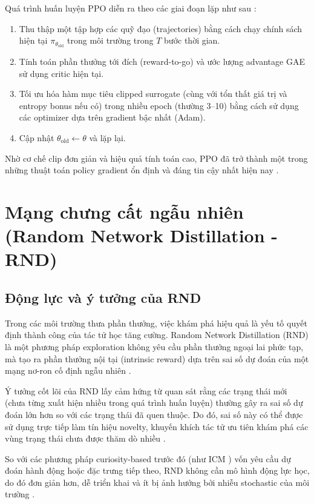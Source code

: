 \documentclass{uetgraduation}
\begin{document}
Quá trình huấn luyện PPO diễn ra theo các giai đoạn lặp như sau \cite{schulman2017}:
\begin{enumerate}
    \item Thu thập một tập hợp các quỹ đạo (trajectories) bằng cách chạy chính sách hiện tại $\pi_{\theta_{\text{old}}}$ trong môi trường trong $T$ bước thời gian.
    \item Tính toán phần thưởng tới đích (reward-to-go) và ước lượng advantage GAE sử dụng critic hiện tại.
    \item Tối ưu hóa hàm mục tiêu clipped surrogate (cùng với tổn thất giá trị và entropy bonus nếu có) trong nhiều epoch (thường 3--10) bằng cách sử dụng các optimizer dựa trên gradient bậc nhất (Adam).
    \item Cập nhật $\theta_{\text{old}} \leftarrow \theta$ và lặp lại.
\end{enumerate}

Nhờ cơ chế clip đơn giản và hiệu quả tính toán cao, PPO đã trở thành một trong những thuật toán policy gradient ổn định và đáng tin cậy nhất hiện nay \cite{schulman2017}.

\section{Mạng chưng cất ngẫu nhiên (Random Network Distillation - RND)}\label{sec:rnd}

\subsection{Động lực và ý tưởng của RND}

Trong các môi trường thưa phần thưởng, việc khám phá hiệu quả là yếu tố quyết định thành công của tác tử học tăng cường. Random Network Distillation (RND) là một phương pháp exploration không yêu cầu phần thưởng ngoại lai phức tạp, mà tạo ra phần thưởng nội tại (intrinsic reward) dựa trên sai số dự đoán của một mạng nơ-ron cố định ngẫu nhiên \cite{burda2019}.

Ý tưởng cốt lõi của RND lấy cảm hứng từ quan sát rằng các trạng thái mới (chưa từng xuất hiện nhiều trong quá trình huấn luyện) thường gây ra sai số dự đoán lớn hơn so với các trạng thái đã quen thuộc. Do đó, sai số này có thể được sử dụng trực tiếp làm tín hiệu novelty, khuyến khích tác tử ưu tiên khám phá các vùng trạng thái chưa được thăm dò nhiều \cite{burda2019}.

So với các phương pháp curiosity-based trước đó (như ICM \cite{pathak2017}) vốn yêu cầu dự đoán hành động hoặc đặc trưng tiếp theo, RND không cần mô hình động lực học, do đó đơn giản hơn, dễ triển khai và ít bị ảnh hưởng bởi nhiễu stochastic của môi trường \cite{burda2019}.
\end{document}
